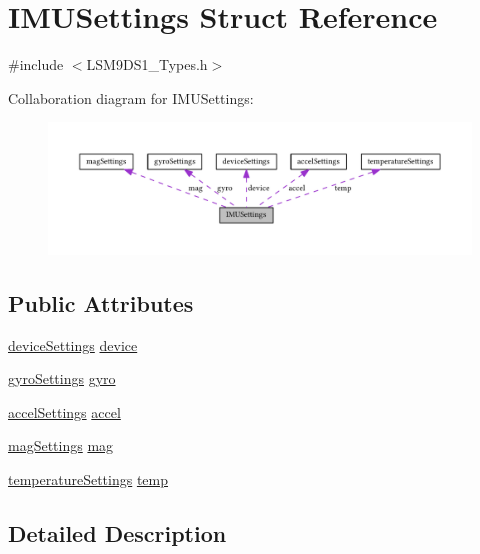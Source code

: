 \hypertarget{struct_i_m_u_settings}{}\section{I\+M\+U\+Settings Struct Reference}
\label{struct_i_m_u_settings}


{\ttfamily \#include $<$L\+S\+M9\+D\+S1\+\_\+\+Types.\+h$>$}



Collaboration diagram for I\+M\+U\+Settings\+:\nopagebreak
\begin{figure}[H]
\begin{center}
\leavevmode
\includegraphics[width=350pt]{struct_i_m_u_settings__coll__graph}
\end{center}
\end{figure}
\subsection*{Public Attributes}
\begin{DoxyCompactItemize}
\item 
\hyperlink{structdevice_settings}{device\+Settings} \hyperlink{struct_i_m_u_settings_a22b2648befc58307b43edc9e74acd583}{device}
\item 
\hyperlink{structgyro_settings}{gyro\+Settings} \hyperlink{struct_i_m_u_settings_afab65feef7d0ca778b035a8805b1e4bf}{gyro}
\item 
\hyperlink{structaccel_settings}{accel\+Settings} \hyperlink{struct_i_m_u_settings_aa8c7bf392c70397ae02ee1f5ad0ea474}{accel}
\item 
\hyperlink{structmag_settings}{mag\+Settings} \hyperlink{struct_i_m_u_settings_aca08359dfa3b8120aa687680d6c06ba7}{mag}
\item 
\hyperlink{structtemperature_settings}{temperature\+Settings} \hyperlink{struct_i_m_u_settings_a55a77555f1843c186db02080078632f2}{temp}
\end{DoxyCompactItemize}


\subsection{Detailed Description}


